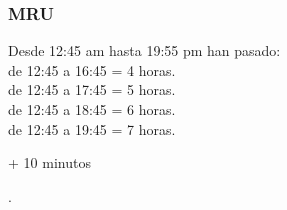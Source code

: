 \documentclass{beamer}
\begin{document}
\begin{frame}
\frametitle{MRU}
% 
 
{\huge                
\xmru
}

Desde 12:45 am hasta
19:55 pm han pasado:\\
{\tiny 
de 12:45 a 16:45 = 4 horas. \\
de 12:45 a 17:45 = 5 horas. \\
de 12:45 a 18:45 = 6 horas. \\
de 12:45 a 19:45 = 7 horas. \\
}

\begin{center}
{\huge + }
10 minutos
\end{center}

.

 
\end{frame}
\end{document}
